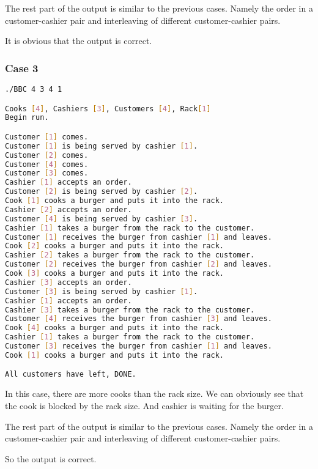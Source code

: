 The rest part of the output is similar to the previous cases. Namely the order in a customer-cashier pair and interleaving of different customer-cashier pairs.

It is obvious that the output is correct.

\subsubsection{Case 3}

\begin{lstlisting}[language=bash]
./BBC 4 3 4 1

Cooks [4], Cashiers [3], Customers [4], Rack[1]
Begin run.

Customer [1] comes.
Customer [1] is being served by cashier [1].
Customer [2] comes.
Customer [4] comes.
Customer [3] comes.
Cashier [1] accepts an order.
Customer [2] is being served by cashier [2].
Cook [1] cooks a burger and puts it into the rack.
Cashier [2] accepts an order.
Customer [4] is being served by cashier [3].
Cashier [1] takes a burger from the rack to the customer.
Customer [1] receives the burger from cashier [1] and leaves.
Cook [2] cooks a burger and puts it into the rack.
Cashier [2] takes a burger from the rack to the customer.
Customer [2] receives the burger from cashier [2] and leaves.
Cook [3] cooks a burger and puts it into the rack.
Cashier [3] accepts an order.
Customer [3] is being served by cashier [1].
Cashier [1] accepts an order.
Cashier [3] takes a burger from the rack to the customer.
Customer [4] receives the burger from cashier [3] and leaves.
Cook [4] cooks a burger and puts it into the rack.
Cashier [1] takes a burger from the rack to the customer.
Customer [3] receives the burger from cashier [1] and leaves.
Cook [1] cooks a burger and puts it into the rack.

All customers have left, DONE.
\end{lstlisting}

In this case, there are more cooks than the rack size. We can obviously see
that the cook is blocked by the rack size. And cashier is waiting for the burger.

The rest part of the output is similar to the previous cases. Namely the order in a customer-cashier pair and interleaving of different customer-cashier pairs.

So the output is correct.

